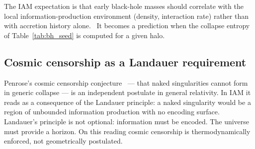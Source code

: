 The IAM expectation is that early black-hole masses should correlate with the local information-production environment (density, interaction rate) rather
than with accretion history alone. \conjecture\ It becomes a prediction when the collapse entropy of Table~\ref{tab:bh_seed} is computed for a given halo. \openprob

\subsection{Cosmic censorship as a Landauer requirement}
Penrose's cosmic censorship conjecture~\cite{Penrose1969} --- that naked singularities cannot form in generic collapse --- is an independent postulate in general relativity.
In IAM it reads as a consequence of the Landauer principle: a naked singularity would be a region of unbounded information production with no encoding
surface. Landauer's principle is not optional: information must be encoded. The universe must provide a horizon. On this reading cosmic censorship is
thermodynamically enforced, not geometrically postulated. \conjecture

